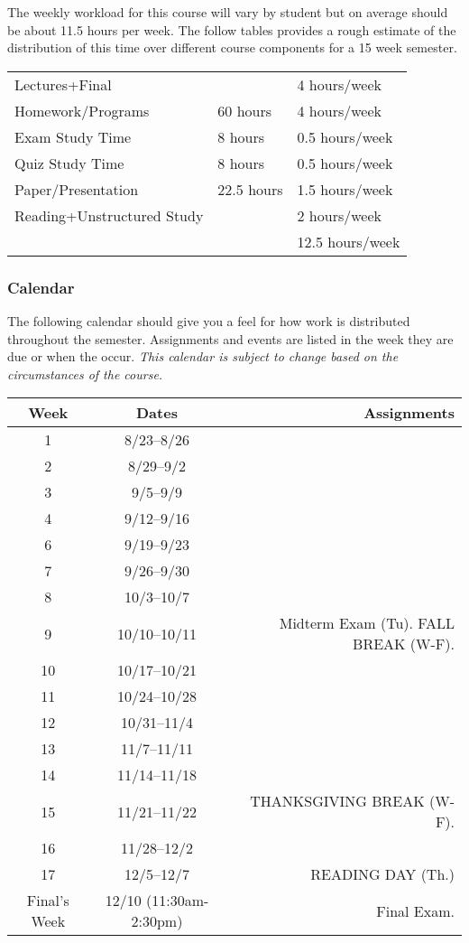\documentclass[10pt]{article}
\begin{document}
The weekly workload for this course will vary by student but on average should be about 11.5 hours per week.  The follow tables provides a rough estimate of the distribution of this time over different course components for a 15 week semester.
\begin{center}
\begin{tabular}{lll}
\toprule
Lectures+Final &           & 4 hours/week \\
Homework/Programs & 60 hours  & 4 hours/week \\
Exam Study Time & 8 hours  & 0.5 hours/week \\
Quiz Study Time & 8 hours & 0.5 hours/week \\
Paper/Presentation & 22.5 hours & 1.5 hours/week \\
Reading+Unstructured Study & & 2 hours/week \\
\midrule
& & 12.5 hours/week \\
\bottomrule
\end{tabular}
\end{center}


\subsubsection{Calendar}

The following calendar should give you a feel for how work is distributed throughout the semester.  Assignments and events are listed in the week they are due or when the occur. \textit{This calendar is subject to change based on the circumstances of the course.}

\begin{center}
\begin{tabular}{ccr}
\toprule
Week & Dates & Assignments \\
\toprule
1 & 8/23--8/26 &  \\
2 & 8/29--9/2 &   \\
3 & 9/5--9/9 &   \\
4 & 9/12--9/16 &  \\
6 & 9/19--9/23 & \\
7 & 9/26--9/30  &  \\
8 & 10/3--10/7 &  \\
9 & 10/10--10/11 & Midterm Exam (Tu).  FALL BREAK (W-F). \\
10 & 10/17--10/21 &  \\
11 & 10/24--10/28 & \\
12 & 10/31--11/4 &  \\
13 & 11/7--11/11 & \\
14 & 11/14--11/18 &  \\
15 & 11/21--11/22 &  THANKSGIVING BREAK (W-F).  \\
16 & 11/28--12/2 &    \\
17 & 12/5--12/7 &   READING DAY (Th.) \\
\midrule
Final's Week & 12/10 (11:30am-2:30pm) & Final Exam. \\
\bottomrule
\end{tabular}
\end{center}
\end{document}
